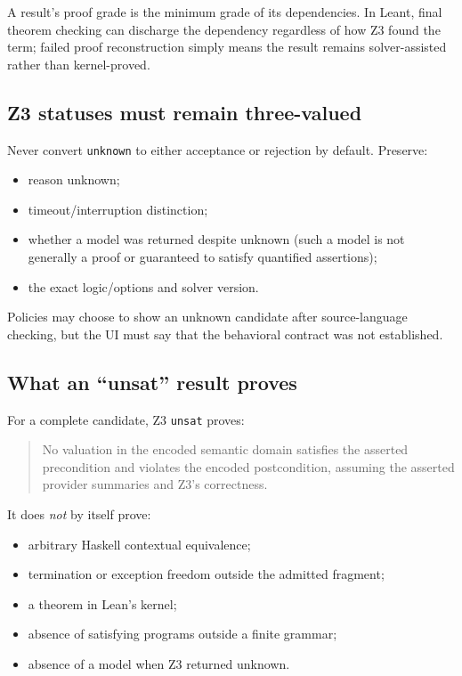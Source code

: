 \documentclass[11pt,oneside]{article}
\newcommand{\code}[1]{\texttt{#1}}
\begin{document}
A result's proof grade is the minimum grade of its dependencies. In Leant, final theorem
checking can discharge the dependency regardless of how Z3 found the term; failed proof
reconstruction simply means the result remains solver-assisted rather than kernel-proved.

\subsection{Z3 statuses must remain three-valued}

Never convert \code{unknown} to either acceptance or rejection by default. Preserve:

\begin{itemize}
  \item reason unknown;
  \item timeout/interruption distinction;
  \item whether a model was returned despite unknown (such a model is not generally a
        proof or guaranteed to satisfy quantified assertions);
  \item the exact logic/options and solver version.
\end{itemize}

Policies may choose to show an unknown candidate after source-language checking, but the
UI must say that the behavioral contract was not established.

\subsection{What an ``unsat'' result proves}

For a complete candidate, Z3 \code{unsat} proves:

\begin{quote}
No valuation in the encoded semantic domain satisfies the asserted precondition and
violates the encoded postcondition, assuming the asserted provider summaries and Z3's
correctness.
\end{quote}

It does \emph{not} by itself prove:

\begin{itemize}
  \item arbitrary Haskell contextual equivalence;
  \item termination or exception freedom outside the admitted fragment;
  \item a theorem in Lean's kernel;
  \item absence of satisfying programs outside a finite grammar;
  \item absence of a model when Z3 returned unknown.
\end{itemize}
\end{document}
